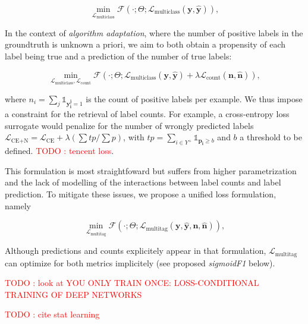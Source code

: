 \documentclass[sigconf,natbib,screen=true,review=true,anonymous]{acmart}
\newcommand\todo[1]{\textcolor{red}{TODO : #1}}
\begin{document}
\begin{equation}
\underset{\mathcal{L}_{\text {multiclass}}} {\min} \mathcal{F}\left(\cdot ; \Theta; \mathcal{L}_{\text {multiclass}} (\mathbf{y}, \hat{\mathbf{y}}) \right),
\end{equation}

In the context of \emph{algorithm adaptation}, where the number of positive labels in the groundtruth is unknown a priori, we aim to both obtain a propensity of each label being true and a prediction of the number of true labels: 

\begin{equation}
\underset{\mathcal{L}_{\text {multiclass}}, \mathcal{L}_{\text {count}}} {\min} \mathcal{F}\left(\cdot ; \Theta; \mathcal{L}_{\text {multiclass}} (\mathbf{y}, \hat{\mathbf{y}}) + \lambda \mathcal{L}_{\text {count}} (\mathbf{n}, \hat{\mathbf{n}})\right),
\end{equation}

where \(n_i = \sum_j \mathds{1}_{\mathbf{y_i^j} = 1}\) is the count of positive labels per example. We thus impose a constraint for the retrieval of label counts. For example, a cross-entropy loss surrogate would penalize for the number of wrongly predicted labels \(\mathcal{L}_{\text {CE+N}}= \mathcal{L}_{\text {CE}} + \lambda (\sum tp / \sum p)\), with \(t p=\sum_{i \in Y^{+}} \mathds{1}_{\mathbf{p_i} \geq b}\) and \(b\) a threshold to be defined. \todo{tencent loss}.

This formulation is most straightfoward but suffers from higher parametrization and the lack of modelling of the interactions between label counts and label prediction. To mitigate these issues, we propose a unified loss formulation, namely

\begin{equation}
\underset{\mathcal{L}_{\text {multitag}}} {\min} \mathcal{F}\left(\cdot ; \Theta; \mathcal{L}_{\text {multitag}} (\mathbf{y}, \hat{\mathbf{y}}, \mathbf{n}, \hat{\mathbf{n}}) \right),
\end{equation}

Although predictions and counts explicitely appear in that formulation, \(\mathcal{L}_{\text {multitag}}\) can optimize for both metrics implicitely (see proposed \emph{sigmoidF1} below).


\todo{look at YOU ONLY TRAIN ONCE: LOSS-CONDITIONAL TRAINING OF DEEP NETWORKS}

\todo{cite stat learning}   \cite[p. 308-310]{statLearning}


\end{document}

